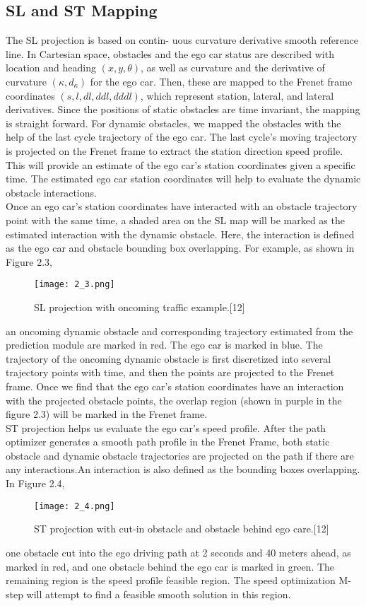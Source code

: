 \documentclass{report}
\begin{document}
\subsection{SL and ST Mapping}
The SL projection is based on contin-
uous curvature derivative smooth reference line. In Cartesian space, obstacles and the
ego car status are described with location and heading $(x, y, θ)$, as well as curvature and the derivative of curvature $(\kappa, d_{\kappa})$ for the ego car. Then, these are mapped to the Frenet frame coordinates $(s, l, dl, ddl, dddl)$, which represent station, lateral, and lateral derivatives. Since the positions of static obstacles are time invariant, the mapping is straight forward. For dynamic obstacles, we mapped the obstacles with the help of the last cycle trajectory of the ego car. The last cycle’s moving trajectory is projected on the Frenet frame to extract the station direction speed profile. This will provide an estimate of the ego car’s station coordinates given a specific time. The estimated ego car station coordinates will help to evaluate the dynamic obstacle interactions.\\
\indent
Once an ego car’s station coordinates have interacted with an obstacle trajectory point with the same time, a shaded area on the SL map will be marked as the estimated interaction with the dynamic obstacle. Here, the interaction is defined as the ego car and obstacle bounding box overlapping. For example, as shown in Figure 2.3, 
  \begin{figure}[ht]
	\centering
	\texttt{[image: 2\_3.png]}
	\caption{SL projection with oncoming traffic example.[12]}
	\label{fig:2.3} 
\end{figure}
an oncoming dynamic obstacle and corresponding trajectory estimated from the prediction module are marked in red. The ego car is marked in blue. The trajectory of the oncoming dynamic obstacle is first discretized into several trajectory points with time, and then the points are projected to the Frenet frame. Once we find that the ego car’s station coordinates have an interaction with the projected obstacle points, the overlap region (shown in purple in the figure 2.3) will be marked in the Frenet frame.\\
\indent
ST projection helps us evaluate the ego car’s speed profile. After the path optimizer generates a smooth path profile in the Frenet Frame, both static obstacle and dynamic obstacle trajectories are projected on the path if there are any interactions.An interaction is also defined as the bounding boxes overlapping. In Figure 2.4,
  \begin{figure}[ht]
	\centering
	\texttt{[image: 2\_4.png]}
	\caption{ST projection with cut-in obstacle and obstacle behind ego care.[12]}
	\label{fig:2.4} 
\end{figure}
 one obstacle cut into the ego driving path at 2 seconds and 40 meters ahead, as marked in red, and one obstacle behind the ego car is marked in green. The remaining region is the speed profile feasible region. The speed optimization M-step will attempt to find a feasible smooth solution in this region.
 
\end{document}

